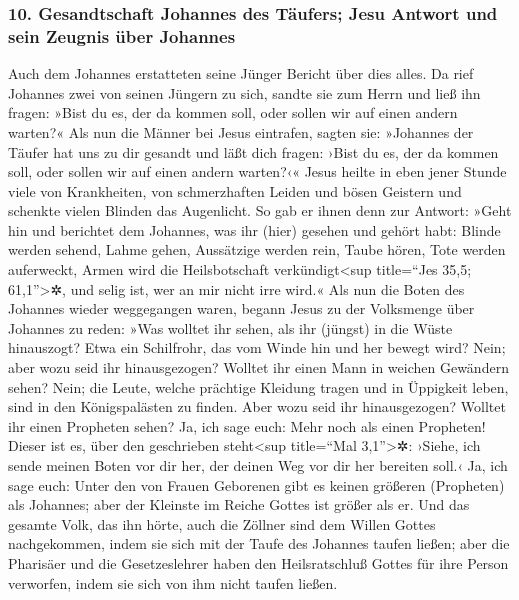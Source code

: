 \hypertarget{gesandtschaft-johannes-des-tuxe4ufers-jesu-antwort-und-sein-zeugnis-uxfcber-johannes}{%
\subsubsection{10. Gesandtschaft Johannes des Täufers; Jesu Antwort und
sein Zeugnis über
Johannes}\label{gesandtschaft-johannes-des-tuxe4ufers-jesu-antwort-und-sein-zeugnis-uxfcber-johannes}}

 Auch dem Johannes erstatteten seine Jünger Bericht über
dies alles. Da rief Johannes zwei von seinen Jüngern zu sich,
 sandte sie zum Herrn und ließ ihn fragen: »Bist du es,
der da kommen soll, oder sollen wir auf einen andern warten?«
 Als nun die Männer bei Jesus eintrafen, sagten sie:
»Johannes der Täufer hat uns zu dir gesandt und läßt dich fragen: ›Bist
du es, der da kommen soll, oder sollen wir auf einen andern warten?‹«
 Jesus heilte in eben jener Stunde viele von Krankheiten,
von schmerzhaften Leiden und bösen Geistern und schenkte vielen Blinden
das Augenlicht.  So gab er ihnen denn zur Antwort: »Geht
hin und berichtet dem Johannes, was ihr (hier) gesehen und gehört habt:
Blinde werden sehend, Lahme gehen, Aussätzige werden rein, Taube hören,
Tote werden auferweckt, Armen wird die Heilsbotschaft
verkündigt\textless sup title=``Jes 35,5; 61,1''\textgreater✲,
 und selig ist, wer an mir nicht irre wird.«
 Als nun die Boten des Johannes wieder weggegangen waren,
begann Jesus zu der Volksmenge über Johannes zu reden: »Was wolltet ihr
sehen, als ihr (jüngst) in die Wüste hinauszogt? Etwa ein Schilfrohr,
das vom Winde hin und her bewegt wird?  Nein; aber wozu
seid ihr hinausgezogen? Wolltet ihr einen Mann in weichen Gewändern
sehen? Nein; die Leute, welche prächtige Kleidung tragen und in
Üppigkeit leben, sind in den Königspalästen zu finden. 
Aber wozu seid ihr hinausgezogen? Wolltet ihr einen Propheten sehen? Ja,
ich sage euch: Mehr noch als einen Propheten!  Dieser ist
es, über den geschrieben steht\textless sup title=``Mal
3,1''\textgreater✲: ›Siehe, ich sende meinen Boten vor dir her, der
deinen Weg vor dir her bereiten soll.‹  Ja, ich sage
euch: Unter den von Frauen Geborenen gibt es keinen größeren (Propheten)
als Johannes; aber der Kleinste im Reiche Gottes ist größer als er.
 Und das gesamte Volk, das ihn hörte, auch die Zöllner
sind dem Willen Gottes nachgekommen, indem sie sich mit der Taufe des
Johannes taufen ließen;  aber die Pharisäer und die
Gesetzeslehrer haben den Heilsratschluß Gottes für ihre Person
verworfen, indem sie sich von ihm nicht taufen ließen.

